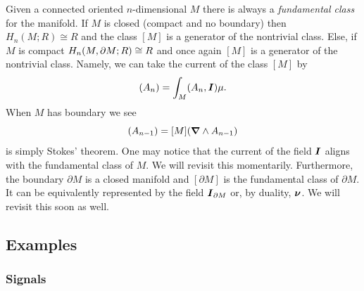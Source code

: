 \documentclass{article}
\begin{document}
Given a connected oriented $n$-dimensional $M$ there is always a \emph{fundamental class} for the manifold. If $M$ is closed (compact and no boundary) then $H_n(M;R) \cong R$ and the class $[M]$ is a generator of the nontrivial class. Else, if $M$ is compact $H_n(M,{\partial M};R) \cong R$ and once again $[M]$ is a generator of the nontrivial class. Namely, we can take the current of the class $[M]$ by
\begin{equation}
    [M](A_n) = \int_M (A_n,\pseudoscalar)\mu.
\end{equation}
When $M$ has boundary we see
\begin{equation}
    [\partial M] (A_{n-1}) = [M](\grad \wedge A_{n-1})
\end{equation}
is simply Stokes' theorem. One may notice that the current of the field $\boldsymbol{I}$ aligns with the fundamental class of $M$. We will revisit this momentarily. Furthermore, the boundary $\partial M$ is a closed manifold and $[\partial M]$ is the fundamental class of $\partial M$. It can be equivalently represented by the field $\boldsymbol{I}_{{\partial M}}$ or, by duality, $\boldsymbol{\nu}$. We will revisit this soon as well.

\subsection{Examples}

\subsubsection{Signals}
\end{document}
